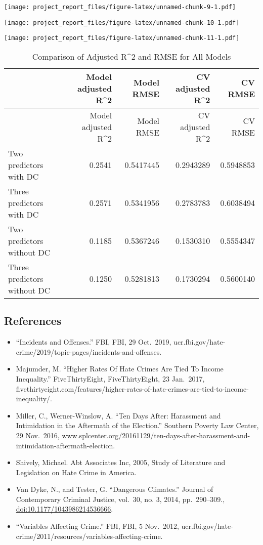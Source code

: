 \documentclass[
]{article}
\providecommand{\tightlist}{%
  \setlength{\itemsep}{0pt}\setlength{\parskip}{0pt}}
\begin{document}
\texttt{[image: project\_report\_files/figure-latex/unnamed-chunk-9-1.pdf]}

\texttt{[image: project\_report\_files/figure-latex/unnamed-chunk-10-1.pdf]}

\texttt{[image: project\_report\_files/figure-latex/unnamed-chunk-11-1.pdf]}

\begin{longtable}[]{@{}lrrrr@{}}
\caption{Comparison of Adjusted R\^{}2 and RMSE for All
Models}\tabularnewline
\toprule
& Model adjusted R\^{}2 & Model RMSE & CV adjusted R\^{}2 & CV
RMSE\tabularnewline
\midrule
\endfirsthead
\toprule
& Model adjusted R\^{}2 & Model RMSE & CV adjusted R\^{}2 & CV
RMSE\tabularnewline
\midrule
\endhead
Two predictors with DC & 0.2541 & 0.5417445 & 0.2943289 &
0.5948853\tabularnewline
Three predictors with DC & 0.2571 & 0.5341956 & 0.2783783 &
0.6038494\tabularnewline
Two predictors without DC & 0.1185 & 0.5367246 & 0.1530310 &
0.5554347\tabularnewline
Three predictors without DC & 0.1250 & 0.5281813 & 0.1730294 &
0.5600140\tabularnewline
\bottomrule
\end{longtable}

\hypertarget{references}{%
\subsection{References}\label{references}}

\begin{itemize}
\tightlist
\item
  ``Incidents and Offenses.'' FBI, FBI, 29 Oct.~2019,
  ucr.fbi.gov/hate-crime/2019/topic-pages/incidents-and-offenses.
\item
  Majumder, M. ``Higher Rates Of Hate Crimes Are Tied To Income
  Inequality.'' FiveThirtyEight, FiveThirtyEight, 23 Jan.~2017,
  fivethirtyeight.com/features/higher-rates-of-hate-crimes-are-tied-to-income-inequality/.
\item
  Miller, C., Werner-Winslow, A. ``Ten Days After: Harassment and
  Intimidation in the Aftermath of the Election.'' Southern Poverty Law
  Center, 29 Nov.~2016,
  www.splcenter.org/20161129/ten-days-after-harassment-and-intimidation-aftermath-election.\\
\item
  Shively, Michael. Abt Associates Inc, 2005, Study of Literature and
  Legislation on Hate Crime in America.
\item
  Van Dyke, N., and Tester, G. ``Dangerous Climates.'' Journal of
  Contemporary Criminal Justice, vol.~30, no. 3, 2014, pp.~290--309.,
  \url{doi:10.1177/1043986214536666}.
\item
  ``Variables Affecting Crime.'' FBI, FBI, 5 Nov.~2012,
  ucr.fbi.gov/hate-crime/2011/resources/variables-affecting-crime.
\end{itemize}
\end{document}
